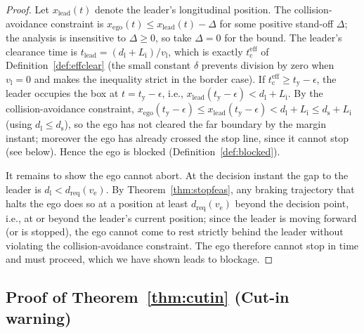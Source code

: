 \documentclass[conference, a4paper]{IEEEtran}
\theoremstyle{plain}
\newcommand{\dreq}{d_{\mathrm{req}}}
\newcommand{\ds}{d_{\mathrm{s}}}
\newcommand{\dl}{d_{\mathrm{l}}}
\newcommand{\tred}{t_{\mathrm{y}}}
\newcommand{\teff}{t_{\mathrm{c}}^{\mathrm{eff}}}
\newcommand{\Li}{L_{\mathrm{i}}}
\newcommand{\ve}{v_{\mathrm{e}}}
\newcommand{\vl}{v_{\mathrm{l}}}
\begin{document}
\begin{proof}
Let $x_{\mathrm{lead}}(t)$ denote the leader's longitudinal position. The
collision-avoidance constraint is
$x_{\mathrm{ego}}(t) \leq x_{\mathrm{lead}}(t) - \Delta$ for some positive
stand-off $\Delta$; the analysis is insensitive to $\Delta \geq 0$, so take
$\Delta = 0$ for the bound. The leader's clearance time is
$t_{\mathrm{lead}} = (\dl + \Li)/\vl$, which is exactly $\teff$ of
Definition~\ref{def:effclear} (the small constant $\delta$ prevents
division by zero when $\vl = 0$ and makes the inequality strict in the
border case). If $\teff \geq \tred - \epsilon$, the leader occupies the box
at $t = \tred - \epsilon$, i.e., $x_{\mathrm{lead}}(\tred-\epsilon) <
\dl + \Li$. By the collision-avoidance constraint,
$x_{\mathrm{ego}}(\tred-\epsilon) \leq x_{\mathrm{lead}}(\tred-\epsilon) <
\dl + \Li \leq \ds + \Li$ (using $\dl \leq \ds$), so the ego has not cleared
the far boundary by the margin instant; moreover the ego has already crossed
the stop line, since it cannot stop (see below). Hence the ego is blocked
(Definition~\ref{def:blocked}).

It remains to show the ego cannot abort. At the decision instant the gap to
the leader is $\dl < \dreq(\ve)$. By Theorem~\ref{thm:stopfeas}, any braking
trajectory that halts the ego does so at a position at least $\dreq(\ve)$
beyond the decision point, i.e., at or beyond the leader's current position;
since the leader is moving forward (or is stopped), the ego cannot come to
rest strictly behind the leader without violating the collision-avoidance
constraint. The ego therefore cannot stop in time and must proceed, which we
have shown leads to blockage.
\end{proof}

\subsection{Proof of Theorem~\ref{thm:cutin} (Cut-in warning)}
\end{document}
